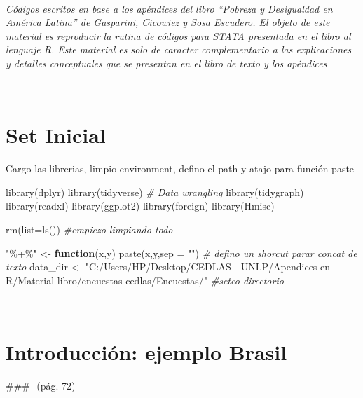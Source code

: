 \documentclass[
]{book}
\newenvironment{Shaded}{\begin{snugshade}}{\end{snugshade}}
\newcommand{\AttributeTok}[1]{\textcolor[rgb]{0.77,0.63,0.00}{#1}}
\newcommand{\CommentTok}[1]{\textcolor[rgb]{0.56,0.35,0.01}{\textit{#1}}}
\newcommand{\ControlFlowTok}[1]{\textcolor[rgb]{0.13,0.29,0.53}{\textbf{#1}}}
\newcommand{\FunctionTok}[1]{\textcolor[rgb]{0.00,0.00,0.00}{#1}}
\newcommand{\NormalTok}[1]{#1}
\newcommand{\OtherTok}[1]{\textcolor[rgb]{0.56,0.35,0.01}{#1}}
\newcommand{\StringTok}[1]{\textcolor[rgb]{0.31,0.60,0.02}{#1}}
\begin{document}
~

\emph{Códigos escritos en base a los apéndices del libro ``Pobreza y Desigualdad en América Latina'' de Gasparini, Cicowiez y Sosa Escudero. El objeto de este material es reproducir la rutina de códigos para STATA presentada en el libro al lenguaje R. Este material es solo de caracter complementario a las explicaciones y detalles conceptuales que se presentan en el libro de texto y los apéndices}

~

\hypertarget{set-inicial}{%
\section*{Set Inicial}\label{set-inicial}}

Cargo las librerias, limpio environment, defino el path y atajo para función paste

\begin{Shaded}
\begin{Highlighting}[]
\FunctionTok{library}\NormalTok{(dplyr)}
\FunctionTok{library}\NormalTok{(tidyverse) }\CommentTok{\# Data wrangling}
\FunctionTok{library}\NormalTok{(tidygraph)}
\FunctionTok{library}\NormalTok{(readxl)}
\FunctionTok{library}\NormalTok{(ggplot2)}
\FunctionTok{library}\NormalTok{(foreign)}
\FunctionTok{library}\NormalTok{(Hmisc)}

\FunctionTok{rm}\NormalTok{(}\AttributeTok{list=}\FunctionTok{ls}\NormalTok{())    }\CommentTok{\#empiezo limpiando todo }

\StringTok{"\%+\%"} \OtherTok{\textless{}{-}} \ControlFlowTok{function}\NormalTok{(x,y) }\FunctionTok{paste}\NormalTok{(x,y,}\AttributeTok{sep =} \StringTok{""}\NormalTok{)      }\CommentTok{\# defino un shorcut parar concat de texto}
\NormalTok{data\_dir }\OtherTok{\textless{}{-}} \StringTok{"C:/Users/HP/Desktop/CEDLAS {-} UNLP/Apendices en R/Material libro/encuestas{-}cedlas/Encuestas/"}  \CommentTok{\#seteo directorio }
\end{Highlighting}
\end{Shaded}

~

\hypertarget{introducciuxf3n-ejemplo-brasil}{%
\section{Introducción: ejemplo Brasil}\label{introducciuxf3n-ejemplo-brasil}}

\#\#\#- (pág. 72)
\end{document}
